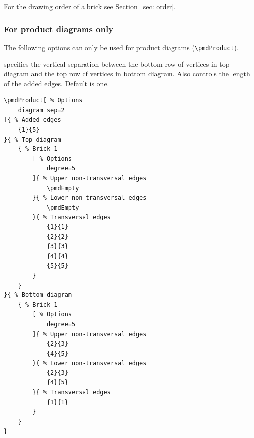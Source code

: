 \documentclass{ltxdoc}
\begin{document}
For the drawing order of a brick see Section~\ref{sec: order}.

\subsubsection{For product diagrams only} \label{sec: prod only}

The following options can only be used for product diagrams (\verb`\pmdProduct`).

specifies the vertical separation between the bottom row of vertices in top diagram and the top row of vertices in bottom diagram. Also controls the length of the added edges. Default is one.
\begin{center}
    \begin{minipage}{\dimexpr0.85\textwidth-2\fboxrule-2\fboxsep\relax}
        \begin{minipage}[c]{0.4\linewidth}
\begin{verbatim}
\pmdProduct[ % Options
    diagram sep=2
]{ % Added edges
    {1}{5}
}{ % Top diagram
    { % Brick 1
        [ % Options
            degree=5
        ]{ % Upper non-transversal edges
            \pmdEmpty
        }{ % Lower non-transversal edges
            \pmdEmpty
        }{ % Transversal edges
            {1}{1}
            {2}{2}
            {3}{3}
            {4}{4}
            {5}{5}
        }
    }
}{ % Bottom diagram
    { % Brick 1
        [ % Options
            degree=5
        ]{ % Upper non-transversal edges
            {2}{3}
            {4}{5}
        }{ % Lower non-transversal edges
            {2}{3}
            {4}{5}
        }{ % Transversal edges
            {1}{1}
        }
    }
}
\end{verbatim}
        \end{minipage}
        \hfill
        \begin{minipage}[c]{0.4\linewidth}
        \end{minipage}
    \end{minipage}%
\end{center}
\begin{center}
\end{center}
\end{document}

